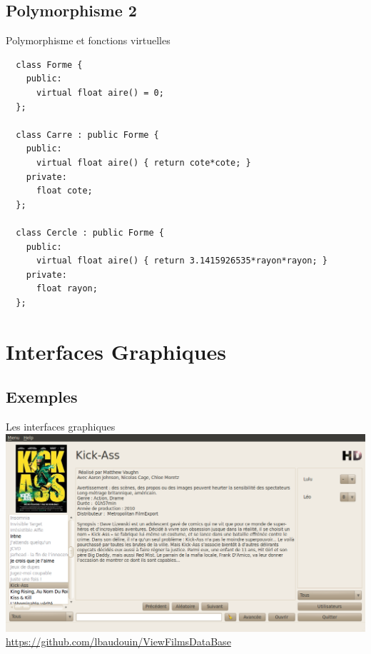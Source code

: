 \documentclass{beamer}
\begin{document}
\subsection*{Polymorphisme 2}
\begin{frame}[fragile]{Polymorphisme et fonctions virtuelles}
  \begin{scriptsize}
\begin{verbatim}
  class Forme {
    public:
      virtual float aire() = 0;
  };
  
  class Carre : public Forme {
    public:
      virtual float aire() { return cote*cote; }
    private:
      float cote;
  };
  
  class Cercle : public Forme {
    public:
      virtual float aire() { return 3.1415926535*rayon*rayon; }
    private:
      float rayon;
  };
\end{verbatim}

  \end{scriptsize}
\end{frame}

\section{Interfaces Graphiques}
\subsection*{Exemples}
\begin{frame}{Les interfaces graphiques}
  \includegraphics[width=\linewidth]{images/interface}\\
  \url{https://github.com/lbaudouin/ViewFilmsDataBase}
\end{frame}
\end{document}
